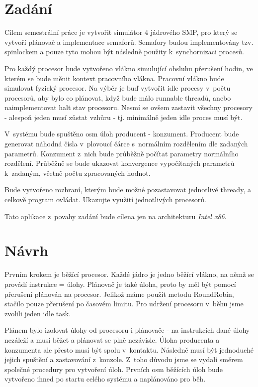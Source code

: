 \documentclass[a4paper,12pt]{article}
\begin{document}
\section{Zadání}

Cílem semestrální práce je vytvořit simulátor 4 jádrového SMP, pro který se vytvoří plánovač a implementace semaforů.
Semafory budou implementovány tzv. spinlockem a pouze tyto mohou být následně použity k~synchornizaci procesů.

Pro každý procesor bude vytvořeno vlákno simulující obsluhu přerušení hodin, ve kterém se bude měnit kontext pracovního vlákna. Pracovní vlákno bude simulovat fyzický procesor. Na výběr je buď vytvořit idle procesy v~počtu procesorů, aby bylo co plánovat, když bude málo runnable threadů, anebo naimplementovat halt stav procesoru. Nesmí se ovšem zastavit všechny procesory - alespoň jeden musí zůstat vzhůru - tj. minimálně jeden idle proces musí být.

V~systému bude spuštěno osm úloh producent - konzument. Producent bude generovat náhodná čísla v~plovoucí čárce s~normálním rozdělením dle zadaných parametrů. Konzument z~nich bude průběžně počítat parametry normálního rozdělení.
Průběžně se bude ukazovat konvergence vypočítaných parametrů k~zadaným, včetně počtu zpracovaných hodnot.

Bude vytvořeno rozhraní, kterým bude možné pozastavovat jednotlivé thready, a celkově program ovládat. Ukazujte využití jednotlivých procesorů.

Tato aplikace z~povahy zadání bude cílena jen na architekturu \emph{Intel x86}.

\section{Návrh}
Prvním krokem je běžící procesor. Každé jádro je jedno běžící vlákno, na němž se provádí instrukce = úlohy. Plánovač je také úloha, proto by měl být pomocí přerušení plánován na procesor. Jelikož máme použít metodu RoundRobin, stačilo pouze přerušení po časovém limitu. Pro udržení procesoru v~běhu jsme zvolili jeden idle task.

Plánem bylo izolovat úlohy od procesoru i plánovače - na instrukcích dané úlohy nezáleží a musí běžet a plánovat se plně nezávisle. Úloha producenta a konzumenta ale přesto musí být spolu v~kontaktu. Následně musí být jednoduché jejich spuštění a zastavování z~konzole.
Z~toho důvodu jsme se vydali směrem společné procedury pro vytvoření úloh. Prvních osm běžících úloh bude vytvořeno ihned po startu celého systému a naplánováno pro běh.
\end{document}
